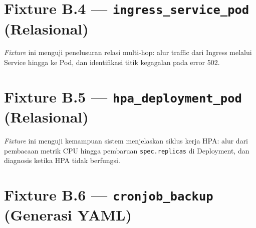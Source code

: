 

\section{Fixture B.4 — \texttt{ingress\_service\_pod} (Relasional)}

\textit{Fixture} ini menguji penelusuran relasi multi-hop: alur traffic dari Ingress melalui Service hingga ke Pod, dan identifikasi titik kegagalan pada error 502.



\section{Fixture B.5 — \texttt{hpa\_deployment\_pod} (Relasional)}

\textit{Fixture} ini menguji kemampuan sistem menjelaskan siklus kerja HPA: alur dari pembacaan metrik CPU hingga pembaruan \texttt{spec.replicas} di Deployment, dan diagnosis ketika HPA tidak berfungsi.



\section{Fixture B.6 — \texttt{cronjob\_backup} (Generasi YAML)}

